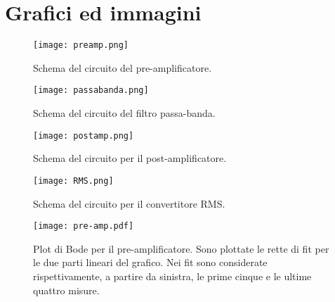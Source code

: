 \section{Grafici ed immagini}

\begin{figure}[h]
	\centering
	\texttt{[image: preamp.png]}
	\caption{Schema del circuito del pre-amplificatore.}
	\label{f:Pre-amp}
\end{figure}

\begin{figure}[h]
	\centering
	\texttt{[image: passabanda.png]}
	\caption{Schema del circuito del filtro passa-banda.}
	\label{f:passabanda}
\end{figure}

\begin{figure}[h]
	\centering
	\texttt{[image: postamp.png]}
	\caption{Schema del circuito per il post-amplificatore.}
	\label{f:post-amp}
\end{figure}

\begin{figure}[h]
	\centering
	\texttt{[image: RMS.png]}
	\caption{Schema del circuito per il convertitore RMS.}
	\label{f:Convertitore}
\end{figure}

\begin{figure}[h]
	\centering
	\texttt{[image: pre-amp.pdf]}
	\caption{Plot di Bode per il pre-amplificatore. Sono plottate le rette di fit per le due parti lineari del grafico. Nei fit sono considerate rispettivamente, a partire da sinistra, le prime cinque e le ultime quattro misure.}
	\label{f:pre-amp}
\end{figure}